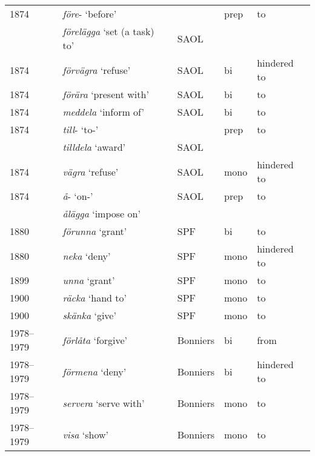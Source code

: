 \documentclass[output=paper]{langscibook}
\begin{document}
\begin{longtable}{ll lll}
1874 & \textit{före}{}-  ‘before’            &          & prep & to\\
     & \textit{förelägga} ‘set (a task) to’  &     SAOL &\\
1874 & \textit{förvägra} ‘refuse’            &     SAOL & bi   & hindered to\\
1874 & \textit{förära} ‘present with’        &     SAOL & bi   & to\\
1874 & \textit{meddela} ‘inform of’          &     SAOL & bi   & to\\
1874 & \textit{till}{}- ‘to-’                &          & prep & to\\
     & \textit{tilldela} ‘award’             &     SAOL &\\
1874 & \textit{vägra} ‘refuse’               &     SAOL & mono  & hindered to\\
1874 & \textit{å}{}- ‘on-’                   &     SAOL & prep &  to\\
     & \textit{ålägga} ‘impose on’           &          &\\
1880 & \textit{förunna} ‘grant’              &      SPF & bi   & to\\
1880 & \textit{neka} ‘deny’                  &      SPF & mono & hindered to\\
1899 & \textit{unna} ‘grant’                 &      SPF & mono & to\\
1900 & \textit{räcka} ‘hand to’              &      SPF & mono & to\\
1900 & \textit{skänka} ‘give’                &      SPF & mono & to\\
1978--1979 & \textit{förlåta} ‘forgive’      & Bonniers & bi  & from\\
1978--1979 & \textit{förmena} ‘deny’         & Bonniers & bi  & hindered to\\
1978--1979 & \textit{servera} ‘serve with’   & Bonniers & mono & to\\
1978--1979 & \textit{visa} ‘show’            & Bonniers & mono & to\\
\end{longtable}
\end{document}
